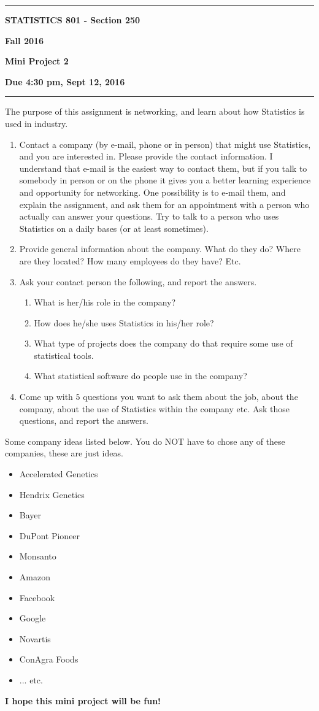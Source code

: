 \documentclass[12pt]{article}
\begin{document}
\hrule
\medskip
\centerline{\textbf{STATISTICS 801 - Section 250}}\hfill \textbf{Fall 2016}
\centerline{\textbf{Mini Project 2}}
\centerline{\textbf{Due 4:30 pm, Sept 12, 2016}}
\smallskip
\hrule

The purpose of this assignment is networking, and learn about how Statistics is used in industry. 
\begin{enumerate}
\item Contact a company (by e-mail, phone or in person) that might use Statistics, and you are interested in. Please provide the contact information. I understand that e-mail is the easiest way to contact them, but if you talk to somebody in person or on the phone it gives you a better learning experience and opportunity for networking. One possibility is to e-mail them, and explain the assignment, and ask them for an appointment with a person who actually can answer your questions. Try to talk to a person who uses Statistics on a daily bases (or at least sometimes).
\item Provide general information about the company. What do they do? Where are they located? How many employees do they have? Etc.
\item Ask your contact person the following, and report the answers.
\begin{enumerate}
\item What is her/his role in the company?
\item How does he/she uses Statistics in his/her role?
\item What type of projects does the company do that require some use of statistical tools.
\item What statistical software do people use in the company?
\end{enumerate}
\item Come up with $5$ questions you want to ask them about the job, about the company, about the use of Statistics within the company etc. Ask those questions, and report the answers. 
\end{enumerate}

Some company ideas listed below. You do NOT have to chose any of these companies, these are just ideas.
\begin{itemize}
\item Accelerated Genetics
\item Hendrix Genetics
\item Bayer
\item DuPont Pioneer
\item Monsanto
\item Amazon
\item Facebook
\item Google
\item Novartis 
\item ConAgra Foods
\item ... etc.

\end{itemize}

\textbf{I hope this mini project will be fun!}
\end{document}
